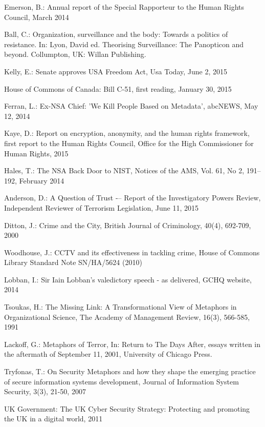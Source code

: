 \documentclass{llncs}
\begin{document}
%
%
\begin{thebibliography}{}
%
Emerson, B.:
Annual report of the Special Rapporteur to the Human Rights Council, March 2014

Ball, C.:
Organization, surveillance and the body: Towards a politics of resistance. In: Lyon, David ed. Theorising Surveillance: The Panopticon and beyond. Collumpton, UK: Willan Publishing. 

Kelly, E.:
Senate approves USA Freedom Act, Usa Today,  June 2, 2015

House of Commons of Canada:
Bill C-51, first reading, January 30, 2015

Ferran, L.:
Ex-NSA Chief: 'We Kill People Based on Metadata', abcNEWS, May 12, 2014

Kaye, D.:
Report on encryption, anonymity, and the human rights framework, first report to the Human Rights Council, Office for the High Commissioner for Human Rights, 2015

Hales, T.:
The NSA Back Door to NIST, Notices of the AMS, Vol. 61, No 2, 191--192, February 2014

Anderson, D.:
A Question of Trust -– Report of the Investigatory Powers Review, Independent Reviewer of Terrorism Legislation, June 11, 2015

Ditton, J.:
Crime and the City, British Journal of Criminology, 40(4), 692-709, 2000

Woodhouse, J.:
CCTV and its effectiveness in tackling crime, House of Commons Library Standard Note SN/HA/5624 (2010)

Lobban, I.:
Sir Iain Lobban's valedictory speech - as delivered, GCHQ website, 2014

Tsoukas, H.:
The Missing Link: A Transformational View of Metaphors in Organizational Science, The Academy of Management Review, 16(3), 566-585, 1991 

Lackoff, G.:
Metaphors of Terror, In: Return to The Days After, essays written in the aftermath of September 11, 2001, University of Chicago Press. 

Tryfonas, T.:
On Security Metaphors and how they shape the emerging practice of secure information systems development, Journal of Information System Security, 3(3), 21-50, 2007

UK Government:
The UK Cyber Security Strategy: Protecting and promoting the UK in a digital world, 2011


\end{thebibliography}
\end{document}
